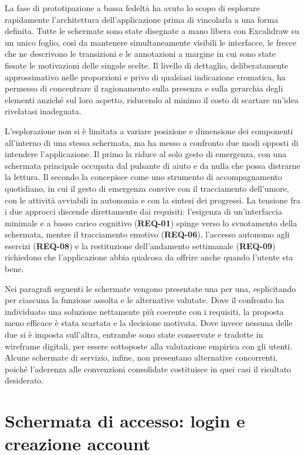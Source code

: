 La fase di prototipazione a bassa fedeltà ha avuto lo scopo di esplorare rapidamente l'architettura dell'applicazione prima di vincolarla a una forma definita.
Tutte le schermate sono state disegnate a mano libera con Excalidraw su un unico foglio, così da mantenere simultaneamente visibili le interfacce, le frecce che ne descrivono le transizioni e le annotazioni a margine in cui sono state fissate le motivazioni delle singole scelte.
Il livello di dettaglio, deliberatamente approssimativo nelle proporzioni e privo di qualsiasi indicazione cromatica, ha permesso di concentrare il ragionamento sulla presenza e sulla gerarchia degli elementi anziché sul loro aspetto, riducendo al minimo il costo di scartare un'idea rivelatasi inadeguata.

L'esplorazione non si è limitata a variare posizione e dimensione dei componenti all'interno di una stessa schermata, ma ha messo a confronto due modi opposti di intendere l'applicazione.
Il primo la riduce al solo gesto di emergenza, con una schermata principale occupata dal pulsante di aiuto e da nulla che possa distrarne la lettura.
Il secondo la concepisce come uno strumento di accompagnamento quotidiano, in cui il gesto di emergenza convive con il tracciamento dell'umore, con le attività avviabili in autonomia e con la sintesi dei progressi.
La tensione fra i due approcci discende direttamente dai requisiti: l'esigenza di un'interfaccia minimale e a basso carico cognitivo (\textbf{REQ-01}) spinge verso lo svuotamento della schermata, mentre il tracciamento emotivo (\textbf{REQ-06}), l'accesso autonomo agli esercizi (\textbf{REQ-08}) e la restituzione dell'andamento settimanale (\textbf{REQ-09}) richiedono che l'applicazione abbia qualcosa da offrire anche quando l'utente sta bene.

Nei paragrafi seguenti le schermate vengono presentate una per una, esplicitando per ciascuna la funzione assolta e le alternative valutate.
Dove il confronto ha individuato una soluzione nettamente più coerente con i requisiti, la proposta meno efficace è stata scartata e la decisione motivata.
Dove invece nessuna delle due si è imposta sull'altra, entrambe sono state conservate e tradotte in wireframe digitali, per essere sottoposte alla valutazione empirica con gli utenti.
Alcune schermate di servizio, infine, non presentano alternative concorrenti, poiché l'aderenza alle convenzioni consolidate costituisce in quei casi il risultato desiderato.

\section{Schermata di accesso: login e creazione account}
\label{sec:sketch-accesso}

